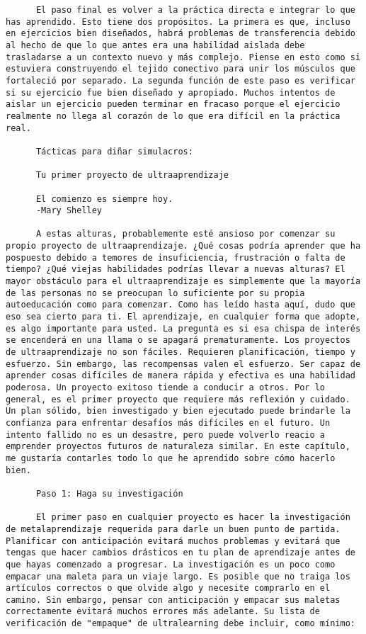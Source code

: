 \begin{verbatim}
	  El paso final es volver a la práctica directa e integrar lo que has aprendido. Esto tiene dos propósitos. La primera es que, incluso en ejercicios bien diseñados, habrá problemas de transferencia debido al hecho de que lo que antes era una habilidad aislada debe trasladarse a un contexto nuevo y más complejo. Piense en esto como si estuviera construyendo el tejido conectivo para unir los músculos que fortaleció por separado. La segunda función de este paso es verificar si su ejercicio fue bien diseñado y apropiado. Muchos intentos de aislar un ejercicio pueden terminar en fracaso porque el ejercicio realmente no llega al corazón de lo que era difícil en la práctica real. 
	  
	  Tácticas para diñar simulacros: 
	  
	  Tu primer proyecto de ultraaprendizaje
	  
	  El comienzo es siempre hoy.
	  -Mary Shelley
	  
	  A estas alturas, probablemente esté ansioso por comenzar su propio proyecto de ultraaprendizaje. ¿Qué cosas podría aprender que ha pospuesto debido a temores de insuficiencia, frustración o falta de tiempo? ¿Qué viejas habilidades podrías llevar a nuevas alturas? El mayor obstáculo para el ultraaprendizaje es simplemente que la mayoría de las personas no se preocupan lo suficiente por su propia autoeducación como para comenzar. Como has leído hasta aquí, dudo que eso sea cierto para ti. El aprendizaje, en cualquier forma que adopte, es algo importante para usted. La pregunta es si esa chispa de interés se encenderá en una llama o se apagará prematuramente. Los proyectos de ultraaprendizaje no son fáciles. Requieren planificación, tiempo y esfuerzo. Sin embargo, las recompensas valen el esfuerzo. Ser capaz de aprender cosas difíciles de manera rápida y efectiva es una habilidad poderosa. Un proyecto exitoso tiende a conducir a otros. Por lo general, es el primer proyecto que requiere más reflexión y cuidado. Un plan sólido, bien investigado y bien ejecutado puede brindarle la confianza para enfrentar desafíos más difíciles en el futuro. Un intento fallido no es un desastre, pero puede volverlo reacio a emprender proyectos futuros de naturaleza similar. En este capítulo, me gustaría contarles todo lo que he aprendido sobre cómo hacerlo bien.
	  
	  Paso 1: Haga su investigación
	  
	  El primer paso en cualquier proyecto es hacer la investigación de metalaprendizaje requerida para darle un buen punto de partida. Planificar con anticipación evitará muchos problemas y evitará que tengas que hacer cambios drásticos en tu plan de aprendizaje antes de que hayas comenzado a progresar. La investigación es un poco como empacar una maleta para un viaje largo. Es posible que no traiga los artículos correctos o que olvide algo y necesite comprarlo en el camino. Sin embargo, pensar con anticipación y empacar sus maletas correctamente evitará muchos errores más adelante. Su lista de verificación de "empaque" de ultralearning debe incluir, como mínimo:
	  

\end{verbatim}

